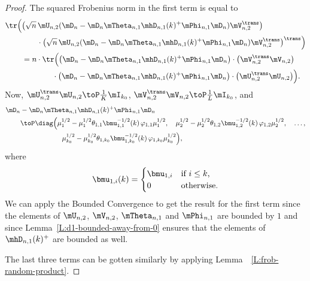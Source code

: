 \begin{proof}
	The squared Frobenius norm in the first term is equal to
	\begin{align*}
		\tr\Big(
			&\big(
				\sqrt{n} \,
				\mU_{n,2} 
				( 
					\mD_n 
					- 
					\mD_n 
					\mTheta_{n,1} \mhD_{n,1}(k)^+ \mPhi_{n,1}
					\mD_n
				)
				\mV_{n,2}^\trans 
			\big) \\
			&\qquad\cdot
			\big(
				\sqrt{n} \,
				\mU_{n,2} 
				( 
					\mD_n 
					- 
					\mD_n 
					\mTheta_{n,1} \mhD_{n,1}(k)^+ \mPhi_{n,1}
					\mD_n
				)
				\mV_{n,2}^\trans 
			\big)^\trans
		\Big) \\
		&=
			n
			\cdot
			\tr\Big(
				\big( 
					\mD_n 
					- 
					\mD_n 
					\mTheta_{n,1} \mhD_{n,1}(k)^+ \mPhi_{n,1}
					\mD_n
				\big)
				\cdot
				\big(
					\mV_{n,2}^\trans 
					\mV_{n,2}
				\big) \\
				&\qquad\qquad\cdot
				\big( 
					\mD_n 
					- 
					\mD_n 
					\mTheta_{n,1} \mhD_{n,1}(k)^+ \mPhi_{n,1}
					\mD_n
				\big)
				\cdot
				\big(
					\mU_{n,2}^\trans
					\mU_{n,2} 
				\big) 
			\Big).
	\end{align*}
	Now, 
		$\mU_{n,2}^\trans \mU_{n,2} \toP \frac{1}{K} \mI_{k_0}$,
		$\mV_{n,2}^\trans \mV_{n,2} \toP \frac{1}{L} \mI_{k_0}$,
	and
	\begin{align*}
		\mD_n &- \mD_n \mTheta_{n,1} \mhD_{n,1}(k)^+ \mPhi_{n,1} \mD_n \\
			&\toP
				\diag\Big(
					\mu_1^{1/2}
					-
					\mu_1^{1/2}
					\theta_{1,1}
					\bmu_{1,1}^{-1/2}(k) \,
					\varphi_{1,1}
					\mu_1^{1/2},
					\quad
					\mu_2^{1/2}
					-
					\mu_2^{1/2}
					\theta_{1,2}
					\bmu_{1,2}^{-1/2}(k) \,
					\varphi_{1,2}
					\mu_2^{1/2},
					\quad
					\ldots, \\
					&\qquad\qquad\qquad
					\mu_{k_0}^{1/2}
					-
					\mu_{k_0}^{1/2}
					\theta_{1,k_0}
					\bmu_{1,k_0}^{-1/2}(k) \,
					\varphi_{1,k_0}
					\mu_{k_0}^{1/2} 
				\Big),
	\end{align*}
	where
	\[
		\bmu_{1,i}(k) 
			=
			\begin{cases}
				\bmu_{1,i} &\text{if $i \leq k$,} \\
				0          &\text{otherwise.}
			\end{cases}
	\]
	We can apply the Bounded Convergence to get the result for the first
	term since the elements of $\mU_{n,2}$, $\mV_{n,2}$, $\mTheta_{n,1}$ 
	and $\mPhi_{n,1}$ are bounded by $1$ and since
	Lemma~\ref{L:d1-bounded-away-from-0} ensures that the elements of
	$\mhD_{n,1}(k)^+$ are bounded as well.
	
	The last three terms can be gotten similarly by applying
	Lemma~~\ref{L:frob-random-product}.
\end{proof}

